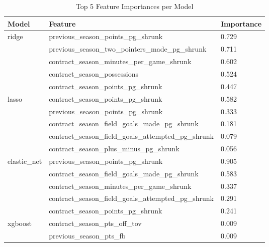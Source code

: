 \documentclass[conference]{IEEEtran}
\begin{document}
\begin{table}[htbp]
    \centering
    \caption{Top 5 Feature Importances per Model}
    \begin{tabular}{lll}
        \toprule
        Model          & Feature                                               & Importance \\
        \midrule
        ridge          & previous\_season\_points\_pg\_shrunk                  & 0.729      \\
                       & previous\_season\_two\_pointers\_made\_pg\_shrunk     & 0.711      \\
                       & contract\_season\_minutes\_per\_game\_shrunk          & 0.602      \\
                       & contract\_season\_possessions                         & 0.524      \\
                       & contract\_season\_points\_pg\_shrunk                  & 0.447      \\
        \midrule
        lasso          & contract\_season\_points\_pg\_shrunk                  & 0.582      \\
                       & previous\_season\_points\_pg\_shrunk                  & 0.333      \\
                       & contract\_season\_field\_goals\_made\_pg\_shrunk      & 0.181      \\
                       & contract\_season\_field\_goals\_attempted\_pg\_shrunk & 0.079      \\
                       & contract\_season\_plus\_minus\_pg\_shrunk             & 0.056      \\
        \midrule
        elastic\_net   & previous\_season\_points\_pg\_shrunk                  & 0.905      \\
                       & contract\_season\_field\_goals\_made\_pg\_shrunk      & 0.583      \\
                       & contract\_season\_minutes\_per\_game\_shrunk          & 0.337      \\
                       & contract\_season\_field\_goals\_attempted\_pg\_shrunk & 0.291      \\
                       & contract\_season\_points\_pg\_shrunk                  & 0.241      \\
        \midrule
        xgboost        & contract\_season\_pts\_off\_tov                       & 0.009      \\
                       & previous\_season\_pts\_fb                             & 0.009      \\

\end{tabular}
\end{table}
\end{document}
